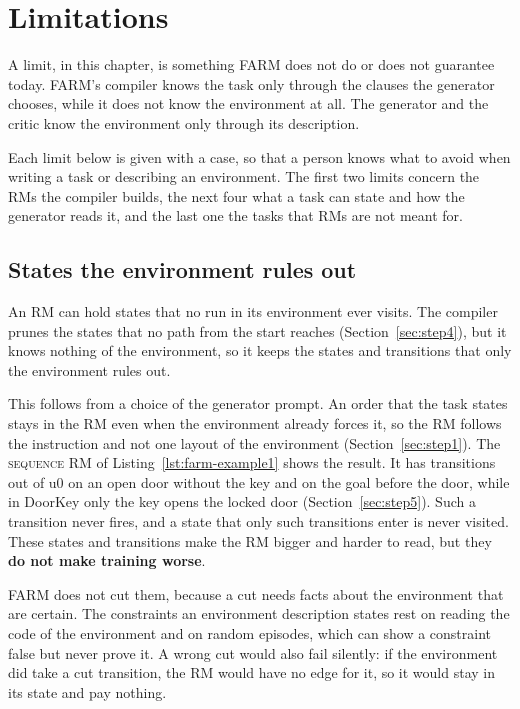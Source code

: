 \documentclass[11pt,english,listoffigures,listoftables]{tfgetsinf}
\newcommand{\runex}[1]{\textsc{#1}}  %
\begin{document}

\chapter{Limitations}
\label{chap:limitations}

A limit, in this chapter, is something FARM does not do or does not guarantee today. FARM's compiler knows the task only through the clauses the generator chooses, while it does not know the environment at all. The generator and the critic know the environment only through its description.

Each limit below is given with a case, so that a person knows what to avoid when writing a task or describing an environment. The first two limits concern the RMs the compiler builds, the next four what a task can state and how the generator reads it, and the last one the tasks that RMs are not meant for.

\section{States the environment rules out}
\label{sec:lim-impossible}
An RM can hold states that no run in its environment ever visits. The compiler prunes the states that no path from the start reaches (Section~\ref{sec:step4}), but it knows nothing of the environment, so it keeps the states and transitions that only the environment rules out.

This follows from a choice of the generator prompt. An order that the task states stays in the RM even when the environment already forces it, so the RM follows the instruction and not one layout of the environment (Section~\ref{sec:step1}). The \runex{sequence} RM of Listing~\ref{lst:farm-example1} shows the result. It has transitions out of u0 on an open door without the key and on the goal before the door, while in DoorKey only the key opens the locked door (Section~\ref{sec:step5}). Such a transition never fires, and a state that only such transitions enter is never visited. These states and transitions make the RM bigger and harder to read, but they \textbf{do not make training worse}.

FARM does not cut them, because a cut needs facts about the environment that are certain. The constraints an environment description states rest on reading the code of the environment and on random episodes, which can show a constraint false but never prove it. A wrong cut would also fail silently: if the environment did take a cut transition, the RM would have no edge for it, so it would stay in its state and pay nothing.
\end{document}
